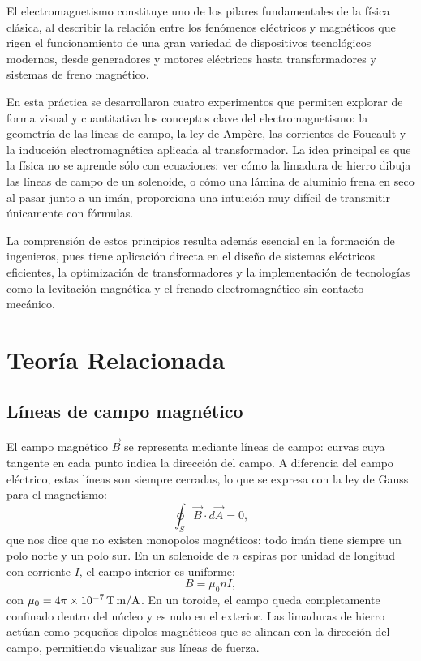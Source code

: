 \documentclass[11pt,twocolumn]{article}
\begin{document}
El electromagnetismo constituye uno de los pilares fundamentales de la f\'isica cl\'asica, al describir la relaci\'on entre los fen\'omenos el\'ectricos y magn\'eticos que rigen el funcionamiento de una gran variedad de dispositivos tecnol\'ogicos modernos, desde generadores y motores el\'ectricos hasta transformadores y sistemas de freno magn\'etico.

En esta pr\'actica se desarrollaron cuatro experimentos que permiten explorar de forma visual y cuantitativa los conceptos clave del electromagnetismo: la geometr\'ia de las l\'ineas de campo, la ley de Amp\`ere, las corrientes de Foucault y la inducci\'on electromagn\'etica aplicada al transformador. La idea principal es que la f\'isica no se aprende s\'olo con ecuaciones: ver c\'omo la limadura de hierro dibuja las l\'ineas de campo de un solenoide, o c\'omo una l\'amina de aluminio frena en seco al pasar junto a un im\'an, proporciona una intuici\'on muy dif\'icil de transmitir \'unicamente con f\'ormulas.

La comprensi\'on de estos principios resulta adem\'as esencial en la formaci\'on de ingenieros, pues tiene aplicaci\'on directa en el dise\~no de sistemas el\'ectricos eficientes, la optimizaci\'on de transformadores y la implementaci\'on de tecnolog\'ias como la levitaci\'on magn\'etica y el frenado electromagn\'etico sin contacto mec\'anico.

\section{Teor\'ia Relacionada}

\subsection*{L\'ineas de campo magn\'etico}

El campo magn\'etico $\vec{B}$ se representa mediante l\'ineas de campo: curvas cuya tangente en cada punto indica la direcci\'on del campo. A diferencia del campo el\'ectrico, estas l\'ineas son siempre cerradas, lo que se expresa con la ley de Gauss para el magnetismo:
\begin{equation}
  \oint_S \vec{B} \cdot d\vec{A} = 0,
\end{equation}
que nos dice que no existen monopolos magn\'eticos: todo im\'an tiene siempre un polo norte y un polo sur. En un solenoide de $n$ espiras por unidad de longitud con corriente $I$, el campo interior es uniforme:
\begin{equation}
  B = \mu_0 n I,
\end{equation}
con $\mu_0 = 4\pi\times10^{-7}\,\text{T\,m/A}$. En un toroide, el campo queda completamente confinado dentro del n\'ucleo y es nulo en el exterior. Las limaduras de hierro act\'uan como peque\~nos dipolos magn\'eticos que se alinean con la direcci\'on del campo, permitiendo visualizar sus l\'ineas de fuerza.
\end{document}
